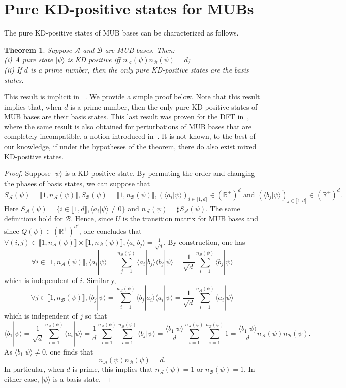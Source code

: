 \documentclass[a4paper, notitlepage, 11pt]{article}
\numberwithin{equation}{section}
\newcommand{\cket}[1]{|#1\rangle}
\newcommand{\bracket}[2]{\langle #1|#2\rangle}
\newcommand{\Acal}{{\mathcal A}}
\newcommand{\Bcal}{{\mathcal B}}
\newcommand{\R}{\mathbb{R}}
\newcommand{\na}{n_{\Acal}}
\newcommand{\nb}{n_{\Bcal}}
\newcommand{\IntEnt}[2]{\llbracket #1 , #2 \rrbracket}
\newtheorem{Theorem}{Theorem}[section]
\begin{document}
\section{Pure KD-positive states for MUBs}\label{s:MUBpure}
The pure KD-positive states of MUB bases can be characterized as follows.


\begin{Theorem}\label{Thm:MUB1}
Suppose  $\Acal$ and $\Bcal$ are MUB bases. Then:\\
(i)  A pure state $\cket{\psi}$ is KD positive iff $\na(\psi)\nb(\psi)=d$;\\
(ii) If $d$ is a prime number, then the only pure KD-positive states are the basis states.\\
\end{Theorem}
This result is implicit in
~\cite{Xu22}. We provide a simple proof below. Note that this result implies that, when $d$ is a prime number, then the only pure KD-positive states of MUB bases are their basis states. This last result was proven for the DFT in~\cite{debievre2023a}, where the same result is also obtained for perturbations of MUB bases that are completely incompatible, a notion introduced in~\cite{debievre2021}. It is not known, to the best of our knowledge, if under the hypotheses of the theorem, there do also exist mixed KD-positive states.  
\begin{proof}
Suppose $\cket{\psi}$ is a KD-positive state. By permuting the order and changing the phases of basis states, we can suppose that 
\[
S_{\Acal}(\psi)= \IntEnt{1}{\na(\psi)},S_{\Bcal}(\psi)= \IntEnt{1}{\nb(\psi)}, \left(\bracket{a_i}{\psi}\right)_{i\in\IntEnt{1}{d}}\in\left(\R^{+}\right)^{d} \text{ and }  \left(\bracket{b_j}{\psi}\right)_{j\in\IntEnt{1}{d}}\in\left(\R^{+}\right)^{d}.
\]
Here $S_{\Acal}(\psi)=\{i\in\IntEnt{1}{d}, \bracket{a_i}{\psi}\neq 0\}$ and $\na(\psi)=\sharp S_{\Acal}(\psi)$. The same definitions hold for $\Bcal$. 
Hence, since $U$ is the transition matrix for MUB bases and since  $Q(\psi)\in \left(\R^{+}\right)^{d^2}$, one concludes that $\forall (i,j)\in\IntEnt{1}{\na(\psi)}\times\IntEnt{1}{\nb(\psi)}, \bracket{a_i}{b_j}=\frac{1}{\sqrt{d}}$. 
By construction, one has
\[
\forall i\in\IntEnt{1}{\na(\psi)}, \bracket{a_i}{\psi} = \sum_{j=1}^{\nb(\psi)} \bracket{a_i}{b_j}\bracket{b_j}{\psi} =  \frac{1}{\sqrt{d}}\sum_{i=1}^{\nb(\psi)}\bracket{b_j}{\psi}
\]
which is independent of $i$. Similarly,
\[
\forall j\in\IntEnt{1}{\nb(\psi)}, \bracket{b_j}{\psi} = \sum_{i=1}^{\na(\psi)} \bracket{b_j}{a_i}\bracket{a_i}{\psi} = \frac{1}{\sqrt{d}}\sum_{i=1}^{\na(\psi)}\bracket{a_i}{\psi}
\]
which is independent of $j$ so that
\[
\bracket{b_1}{\psi} =  \frac{1}{\sqrt{d}}\sum_{i=1}^{\na(\psi)}\bracket{a_i}{\psi} =  \frac{1}{d}\sum_{i=1}^{\na(\psi)}\sum_{i=1}^{\nb(\psi)}\bracket{b_j}{\psi} =\frac{\bracket{b_1}{\psi}}{d}\sum_{i=1}^{\na(\psi)}\sum_{i=1}^{\nb(\psi)}1 = \frac{\bracket{b_1}{\psi}}{d}\na(\psi)\nb(\psi).
\]
As $\bracket{b_1}{\psi}\neq 0$, one finds that
\[
\na(\psi)\nb(\psi) = d.
\]
In particular, when $d$ is prime, this implies that $\na(\psi) =1$ or $\nb(\psi) =1$. In either case, $\cket{\psi}$ is a basis state.
\end{proof}



\end{document}
